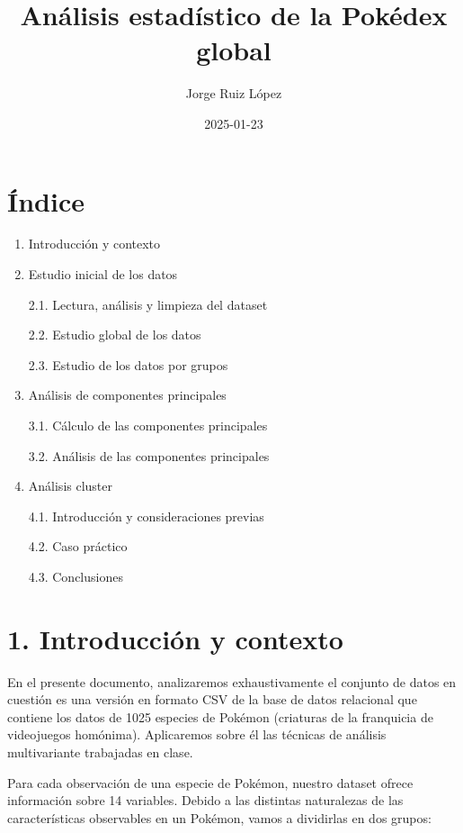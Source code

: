 \documentclass[
  11.8pt,
]{extreport}
\title{Análisis estadístico de la Pokédex global}
\author{Jorge Ruiz López}
\date{2025-01-23}
\begin{document}
\maketitle


\maketitle

\chapter{Índice}\label{uxedndice}

\begin{enumerate}
\def\labelenumi{\arabic{enumi}.}
\item
  Introducción y contexto
\item
  Estudio inicial de los datos

  2.1. Lectura, análisis y limpieza del dataset

  2.2. Estudio global de los datos

  2.3. Estudio de los datos por grupos
\item
  Análisis de componentes principales

  3.1. Cálculo de las componentes principales

  3.2. Análisis de las componentes principales
\item
  Análisis cluster

  4.1. Introducción y consideraciones previas

  4.2. Caso práctico

  4.3. Conclusiones
\end{enumerate}

\chapter{1. Introducción y contexto}\label{introducciuxf3n-y-contexto}

En el presente documento, analizaremos exhaustivamente el conjunto de
datos en cuestión es una versión en formato CSV de la base de datos
relacional que contiene los datos de 1025 especies de Pokémon (criaturas
de la franquicia de videojuegos homónima). Aplicaremos sobre él las
técnicas de análisis multivariante trabajadas en clase.

Para cada observación de una especie de Pokémon, nuestro dataset ofrece
información sobre 14 variables. Debido a las distintas naturalezas de
las características observables en un Pokémon, vamos a dividirlas en dos
grupos:
\end{document}

